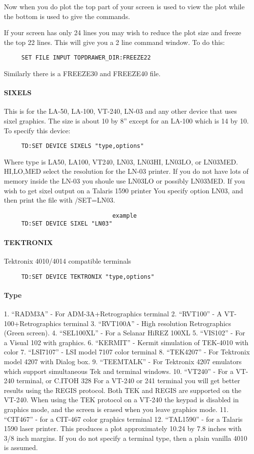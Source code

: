 Now  when  you  do plot the top part of your screen is used to view
the plot while the bottom is used to give the commands.  

If  your  screen  has only 24 lines you may wish to reduce the plot
size and freeze the top 22 lines.  This will  give  you  a  2  line
command window.  To do this:  
\begin{verbatim}
     SET FILE INPUT TOPDRAWER_DIR:FREEZE22 
\end{verbatim}
Similarly there is a FREEZE30 and FREEZE40 file.  
\paragraph{SIXELS}
This  is  for  the  LA-50, LA-100, VT-240, LN-03 and any other device
that uses sixel graphics.  The size is about 10 by 8'' except  for  an
LA-100 which is 14 by 10.  To specify this device:  
\begin{verbatim}
     TD:SET DEVICE SIXELS "type,options" 
\end{verbatim}
Where  type  is LA50, LA100, VT240, LN03, LN03HI, LN03LO, or LN03MED.
HI,LO,MED select the resolution for the LN-03 printer.  If you do not
have  lots  of  memory  inside  the  LN-03  you  shoule use LN03LO or
possibly LN03MED.  If you wish to get sixel output on a Talaris  1590
printer  You  specify  option  LN03,  and  then  print  the file with
/SET=LN03.  
\begin{verbatim}
                               example
     TD:SET DEVICE SIXEL "LN03" 
\end{verbatim}
\paragraph{TEKTRONIX}
Tektronix 4010/4014 compatible terminals 
\begin{verbatim}
     TD:SET DEVICE TEKTRONIX "type,options" 
\end{verbatim}
\paragraph{Type}
1.  ``RADM3A'' - For ADM-3A+Retrographics terminal 
2.  ``RVT100'' - A VT-100+Retrographics terminal 
3.  ``RVT100A'' - High resolution Retrographics (Green screen).  
4.  ``SEL100XL'' - For a Selanar HiREZ 100XL 
5.  ``VIS102'' - For a Visual 102 with graphics.  
6.  ``KERMIT'' - Kermit simulation of TEK-4010 with color 
7.  ``LSI7107'' - LSI model 7107 color terminal 
8.  ``TEK4207'' - For Tektronix model 4207 with Dialog box.  
9.  ``TEEMTALK''   -  For  Tektronix  4207  emulators  which  support
simultaneous Tek and terminal windows.  
10.  ``VT240'' - For a VT-240 terminal, or C.ITOH 328 For a VT-240 or
241 terminal you will get better results using the REGIS  protocol.
Both TEK and REGIS are supported on the VT-240.  When using the TEK
protocol on a VT-240 the keypad is disabled in graphics  mode,  and
the screen is erased when you leave graphics mode.  
11.  ``CIT467'' - for a CIT-467 color graphics terminal 
12.  ``TAL1590'' - for a Talaris 1590 laser printer.  This produces a
plot approximately 10.24 by 7.8 inches with 3/8 inch margins.  
If you do not specify a terminal type, then a plain vanilla 4010 is
assumed.  
